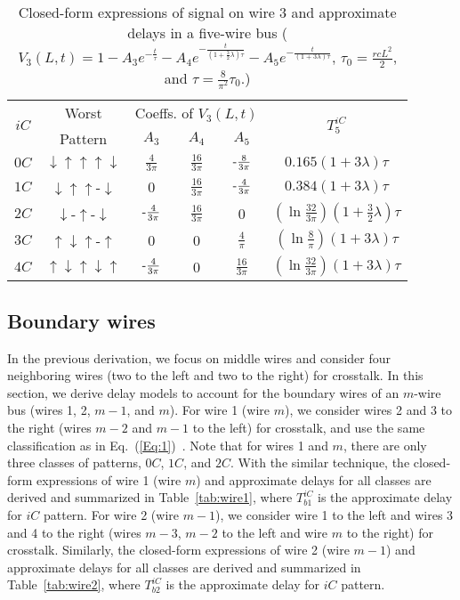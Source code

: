 \documentclass[10pt,journal]{IEEEtran}
\def\d{\downarrow}
\def\u{\uparrow}
\begin{document}
\begin{table}[!t]
\caption{Closed-form expressions of signal on wire 3 and approximate delays in a five-wire bus ($V_3(L,t) = 1-A_3 e^{-\frac{t}{\tau}} - A_4 e^{-\frac{t}{(1+\frac{3}{2}\lambda)\tau}} - A_5 e^{-\frac{t}{(1+3\lambda)\tau}}$, $\tau_0=\frac{rcL^2}{2}$, and $\tau=\frac{8}{\pi^2}\tau_0$.)}\label{tab:5wire}
\begin{center}
\begin{tabular}{|c|c|c|c|c|c|}
\hline
\multirow{2}{*}{$iC$} & Worst & \multicolumn{3}{|c|}{Coeffs. of $V_3(L,t)$} & \multirow{2}{*}{$T_5^{iC}$}\\
\cline{3-5}
& Pattern & $A_3$ & $A_4$ & $A_5$ & \\
\hline
$0C$ & $\d\u\u\u\d$ & $\frac{4}{3\pi}$ & $\frac{16}{3\pi}$ & $\textnormal{-}\frac{8}{3\pi}$ & $0.165(1+3\lambda)\tau$ \\
\hline
$1C$ & $\d\u\u$-$\d$ & 0 & $\frac{16}{3\pi}$ & $\textnormal{-}\frac{4}{3\pi}$ & $0.384(1+3\lambda)\tau$\\
\hline
$2C$ & $\d$-$\u$-$\d$ & $\textnormal{-}\frac{4}{3\pi}$ & $\frac{16}{3\pi}$ & 0 & $\left(\ln{\frac{32}{3\pi}}\right)(1+\frac{3}{2}\lambda)\tau$ \\
\hline
$3C$ & $\u\d\u$-$\u$ & 0 & 0 & $\frac{4}{\pi}$ & $\left(\ln{\frac{8}{\pi}}\right)(1+3\lambda)\tau$ \\
\hline
$4C$ & $\u\d\u\d\u$ & $\textnormal{-}\frac{4}{3\pi}$ & 0 & $\frac{16}{3\pi}$ & $\left(\ln{\frac{32}{3\pi}}\right)(1+3\lambda)\tau$ \\
\hline
\end{tabular}
\end{center}
\end{table}


\subsection{Boundary wires}
\label{sec:boundary}
In the previous derivation, we focus on middle wires and consider four neighboring wires (two to the left and two to the right) for crosstalk. In this section, we derive delay models to account for the boundary wires of an $m$-wire bus (wires 1, 2, $m-1$, and $m$). For wire 1 (wire $m$), we consider wires 2 and 3 to the right (wires $m-2$ and $m-1$ to the left) for crosstalk, and use the same classification as in Eq.~(\ref{Eq:1})~\cite{Sot01}. Note that for wires 1 and $m$, there are only three classes of patterns, $0C$, $1C$, and $2C$.
With the similar technique, the closed-form expressions of wire 1 (wire $m$) and approximate delays for all classes are derived and summarized in Table~\ref{tab:wire1}, where $T_{b1}^{iC}$ is the approximate delay for $iC$ pattern.
For wire 2 (wire $m-1$), we consider wire 1 to the left and wires 3 and 4 to the right (wires $m-3$, $m-2$ to the left and wire $m$ to the right) for crosstalk. Similarly, the closed-form expressions of wire 2 (wire $m-1$) and approximate delays for all classes are derived and summarized in Table~\ref{tab:wire2}, where $T_{b2}^{iC}$ is the approximate delay for $iC$ pattern.
\end{document}
